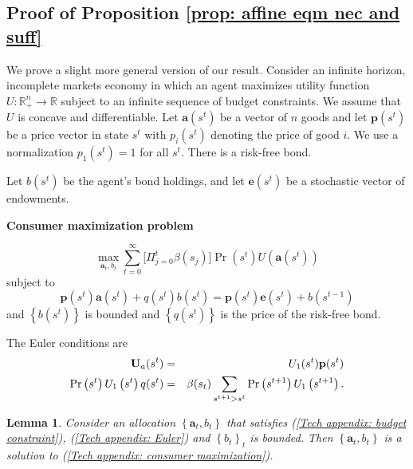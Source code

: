 \documentclass[thmsb,11pt]{article}
\newtheorem{lemma}{Lemma}
\begin{document}
\smallskip
\subsection{\smallskip Proof of Proposition  \ref{prop: affine eqm nec and suff}}
\label{appndx: affine eqm nec and stuff}
\smallskip

We prove a slight more general version of our result. Consider an infinite
horizon, incomplete markets economy in which an agent maximizes utility
function $U:\mathbb{R}_{+}^{n}\rightarrow \mathbb{R}$ subject to an infinite
sequence of budget constraints. We assume that $U$ is concave and
differentiable. Let $\mathbf{a}(s^t)$ be a vector of $n$ goods and let $%
\mathbf{p}(s^{t})$ be a price vector in state $s^{t}$ with $p_{i}(s^{t})$
denoting the price of good $i.$ We use a normalization $p_{1}\left(
s^{t}\right) =1$ for all $s^{t}.$ There is a risk-free bond.

Let $b(s^{t})$ be the agent's bond holdings, and let $\mathbf{e}\left(
s^{t}\right) $ be a stochastic vector of endowments.

\textbf{Consumer maximization problem}


\begin{equation}
\max_{\mathbf{a}_{t},b_{t}}\sum_{t=0}^{\infty }\bigl[\Pi_{j=0}^t \beta(s_j)\bigr]\Pr \left(
s^{t}\right) U(\mathbf{a}\left( s^{t}\right) )
\label{Tech appendix: consumer maximization}
\end{equation}%
subject to%
\begin{equation}
\mathbf{p}\left( s^{t}\right) \mathbf{a}\left( s^{t}\right) +q(s^{t})b\left(
s^{t}\right) =\mathbf{p}\left( s^{t}\right) \mathbf{e}\left( s^{t}\right)
+b\left( s^{t-1}\right)  \label{Tech appendix: budget constraint}
\end{equation}%
and $\left \{ b\left( s^{t}\right) \right \} $ is bounded and $\left \{
q(s^{t})\right \} $ is the price of the risk-free bond.

The Euler conditions are%
\begin{eqnarray}
\mathbf{U}_{a}(s^{t}) &=&U_{1}(s^{t})\mathbf{p}(s^{t})
\label{Tech appendix: Euler} \\
\Pr \left( s^{t}\right) U_{1}\left( s^{t}\right) q(s^{t}) &=&\beta(s_t)
\sum_{s^{t+1}>s^{t}}\Pr \left( s^{t+1}\right) U_{1}\left( s^{t+1}\right) .
\notag
\end{eqnarray}

\begin{lemma}
\smallskip Consider an allocation $\left \{ \mathbf{a}_{t},b_{t}\right \} $
that satisfies (\ref{Tech appendix: budget constraint}), (\ref{Tech
appendix: Euler}) and $\left \{ b_{t}\right \} _{t}$ is bounded. Then $%
\left
\{ \mathbf{a}_{t},b_{t}\right \} $ is a solution to (\ref{Tech
appendix: consumer maximization}).
\end{lemma}
\end{document}
